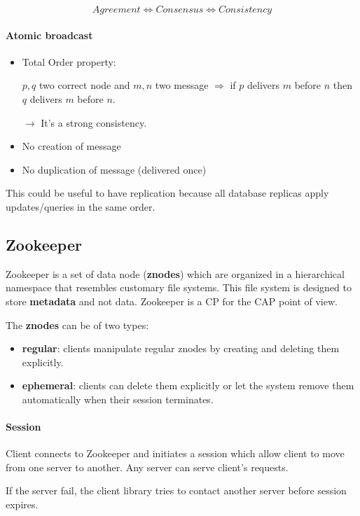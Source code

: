 $$Agreement \Leftrightarrow Consensus \Leftrightarrow Consistency$$

\paragraph{Atomic broadcast}
\begin{itemize}
    \item Total Order property:

        $p, q$ two correct node and $m, n$ two message $\Rightarrow$ if $p$
        delivers $m$ before $n$ then $q$ delivers $m$ before $n$.

        $\rightarrow $ It's a strong consistency.

    \item No creation of message
    \item No duplication of message (delivered once)
\end{itemize}

This could be useful to have replication because all
database replicas apply updates/queries  in  
the  same  order.

\subsection{Zookeeper}
Zookeeper is a set of data node (\textbf{znodes}) which are organized in a
hierarchical namespace that resembles customary file systems. 
This file system is designed to store \textbf{metadata} and not data.
Zookeeper is a \textsc{CP} for the CAP point of view.

The \textbf{znodes} can be of two types:

\begin{itemize}
	\item \textbf{regular}: clients manipulate regular znodes by creating and deleting them explicitly.
	\item \textbf{ephemeral}: clients can delete them explicitly or let the system remove them automatically when their session terminates.
\end{itemize}

\paragraph{Session}
Client connects  to  Zookeeper  and  initiates  a  session
which allow client to move from one server to another. 
Any server can serve client's requests.

If the server fail, the client library tries to  contact  another  server
before  session  expires.

